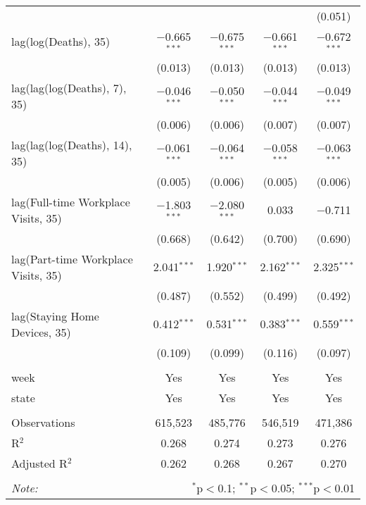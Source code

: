 \begin{tabular}{@{\extracolsep{1pt}}lcccc}
  &  &  &  & (0.051) \\ 
  lag(log(Deaths), 35) & $-$0.665$^{***}$ & $-$0.675$^{***}$ & $-$0.661$^{***}$ & $-$0.672$^{***}$ \\ 
  & (0.013) & (0.013) & (0.013) & (0.013) \\ 
  lag(lag(log(Deaths), 7), 35) & $-$0.046$^{***}$ & $-$0.050$^{***}$ & $-$0.044$^{***}$ & $-$0.049$^{***}$ \\ 
  & (0.006) & (0.006) & (0.007) & (0.007) \\ 
  lag(lag(log(Deaths), 14), 35) & $-$0.061$^{***}$ & $-$0.064$^{***}$ & $-$0.058$^{***}$ & $-$0.063$^{***}$ \\ 
  & (0.005) & (0.006) & (0.005) & (0.006) \\ 
  lag(Full-time Workplace Visits, 35) & $-$1.803$^{***}$ & $-$2.080$^{***}$ & 0.033 & $-$0.711 \\ 
  & (0.668) & (0.642) & (0.700) & (0.690) \\ 
  lag(Part-time Workplace Visits, 35) & 2.041$^{***}$ & 1.920$^{***}$ & 2.162$^{***}$ & 2.325$^{***}$ \\ 
  & (0.487) & (0.552) & (0.499) & (0.492) \\ 
  lag(Staying Home Devices, 35) & 0.412$^{***}$ & 0.531$^{***}$ & 0.383$^{***}$ & 0.559$^{***}$ \\ 
  & (0.109) & (0.099) & (0.116) & (0.097) \\ 
 \hline \\[-1.8ex] 
week & Yes & Yes & Yes & Yes \\ 
state & Yes & Yes & Yes & Yes \\ 
\hline \\[-1.8ex] 
Observations & 615,523 & 485,776 & 546,519 & 471,386 \\ 
R$^{2}$ & 0.268 & 0.274 & 0.273 & 0.276 \\ 
Adjusted R$^{2}$ & 0.262 & 0.268 & 0.267 & 0.270 \\ 
\hline 
\hline \\[-1.8ex] 
\textit{Note:}  & \multicolumn{4}{r}{$^{*}$p$<$0.1; $^{**}$p$<$0.05; $^{***}$p$<$0.01} \\ 
\end{tabular} 